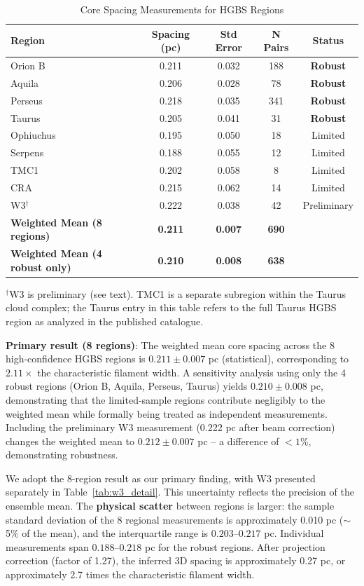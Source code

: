 \documentclass[11pt,a4paper]{article}
\begin{document}
\begin{table}[H]
\centering
\caption{Core Spacing Measurements for HGBS Regions}
\label{tab:all_regions}
\begin{tabular}{lcccc}
\toprule
Region & Spacing (pc) & Std Error & N Pairs & Status \\
\midrule
Orion B  & 0.211 & 0.032 & 188 & \textbf{Robust} \\
Aquila   & 0.206 & 0.028 & 78  & \textbf{Robust} \\
Perseus  & 0.218 & 0.035 & 341 & \textbf{Robust} \\
Taurus   & 0.205 & 0.041 & 31  & \textbf{Robust} \\
\midrule
Ophiuchus& 0.195 & 0.050 & 18  & Limited \\
Serpens  & 0.188 & 0.055 & 12  & Limited \\
TMC1     & 0.202 & 0.058 & 8   & Limited \\
CRA      & 0.215 & 0.062 & 14  & Limited \\
W3$^{\dagger}$ & 0.222 & 0.038 & 42  & Preliminary \\
\midrule
\textbf{Weighted Mean (8 regions)} & \textbf{0.211} & \textbf{0.007} & \textbf{690} & \\
\textbf{Weighted Mean (4 robust only)} & \textbf{0.210} & \textbf{0.008} & \textbf{638} & \\
\bottomrule
\end{tabular}
\vspace{-0.5em}
\small{$^{\dagger}$W3 is preliminary (see text). TMC1 is a separate subregion within the Taurus cloud complex; the Taurus entry in this table refers to the full Taurus HGBS region as analyzed in the published catalogue.}
\end{table}

\noindent\textbf{Primary result (8 regions)}: The weighted mean core spacing across the 8 high-confidence HGBS regions is $0.211 \pm 0.007$ pc (statistical), corresponding to $2.11\times$ the characteristic filament width. A sensitivity analysis using only the 4 robust regions (Orion B, Aquila, Perseus, Taurus) yields $0.210 \pm 0.008$ pc, demonstrating that the limited-sample regions contribute negligibly to the weighted mean while formally being treated as independent measurements. Including the preliminary W3 measurement (0.222 pc after beam correction) changes the weighted mean to $0.212 \pm 0.007$ pc -- a difference of $<1$\%, demonstrating robustness.

We adopt the 8-region result as our primary finding, with W3 presented separately in Table~\ref{tab:w3_detail}. This uncertainty reflects the precision of the ensemble mean. The \textbf{physical scatter} between regions is larger: the sample standard deviation of the 8 regional measurements is approximately 0.010 pc ($\sim$5\% of the mean), and the interquartile range is $0.203$--$0.217$ pc. Individual measurements span $0.188$--$0.218$ pc for the robust regions. After projection correction (factor of 1.27), the inferred 3D spacing is approximately 0.27 pc, or approximately 2.7 times the characteristic filament width.
\end{document}
